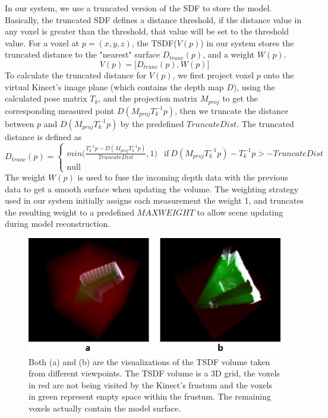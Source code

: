 \documentclass[12pt]{article}
\begin{document}
In our system, we use a truncated version of the SDF to store the model. Basically, the truncated SDF defines a distance threshold, if the distance value in any voxel is greater than the threshold, that value will be set to the threshold value. For a voxel at $p=(x,y,z)$, the TSDF($V(p)$) in our system stores the truncated distance to the "nearest" surface $D_{trunc}(p)$, and a weight $W(p)$.
$$V(p) = \big[ D_{trunc}(p), W(p)\big]$$
To calculate the truncated distance for $V(p)$, we first project voxel $p$ onto the virtual Kinect's image plane (which contains the depth map $D$), using the calculated pose matrix $T_k$, and the projection matrix $M_{proj}$ to get the corresponding measured point $D(M_{proj}T_k^{-1}p)$, then we truncate the distance between $p$ and $D(M_{proj}T_k^{-1}p)$ by the predefined $TruncateDist$. The truncated distance is defined as 
\begin{equation}\label{updating}
    D_{trunc}(p)=
    \begin{cases}
        min\big(\frac{T_k^{-1}p-D(M_{proj}T_k^{-1}p)}{TruncateDist},1\big) &\text{if}~D(M_{proj}T_k^{-1}p)-T_k^{-1}p>-TruncateDist\\
        \text{null}
    \end{cases}
\end{equation}
The weight $W(p)$ is used to fuse the incoming depth data with the previous data to get a smooth surface when updating the volume. The weighting strategy used in our system initially assigns each measurement the weight 1, and truncates the resulting weight to a predefined $MAXWEIGHT$ to allow scene updating during model reconstruction. 

\begin{figure}[h!]
\includegraphics[width=\textwidth]{TSDF.png}
\caption{\label{fig:TSDF_Representation} Both (a) and (b) are the visualizations of the TSDF volume taken from different viewpoints. The TSDF volume is a 3D grid, the voxels in red are not being visited by the Kinect's frustum and the voxels in green represent empty space within the frustum. The remaining voxels actually contain the model surface.}
\end{figure}
\end{document}
